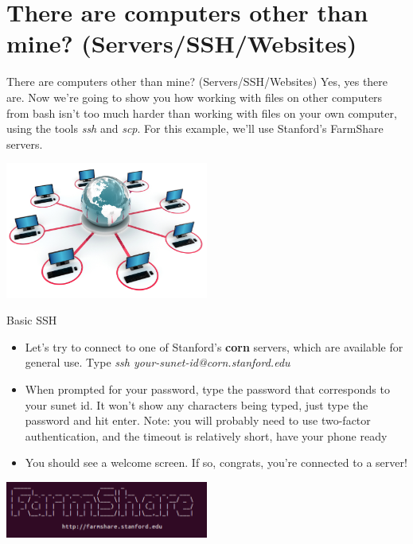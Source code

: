 \documentclass{beamer}
\begin{document}
\section{There are computers other than mine? (Servers/SSH/Websites)}
\begin{frame}{There are computers other than mine? (Servers/SSH/Websites)}
Yes, yes there are. Now we're going to show you how working with files on other computers from bash isn't too much harder than working with files on your own computer, using the tools \emph{ssh} and \emph{scp}. For this example, we'll use Stanford's FarmShare servers.\\[1em]
\begin{center}
\includegraphics[width = 0.5\textwidth]{images/network.jpg}
\end{center}
\end{frame}

\begin{frame}{Basic SSH}
\begin{itemize}
    \item<1-> Let's try to connect to one of Stanford's \textbf{corn} servers, which are available for general use. Type \emph{ssh your-sunet-id@corn.stanford.edu}
    \item<1-> When prompted for your password, type the password that corresponds to your sunet id. It won't show any characters being typed, just type the password and hit enter. Note: you will probably need to use two-factor authentication, and the timeout is relatively short, have your phone ready
    \item<2-> You should see a welcome screen. If so, congrats, you're connected to a server!
\end{itemize}
\begin{center}\vspace{0em}\includegraphics[width = 0.5\textwidth]{images/farmshare.png}\end{center}
\end{frame}
\end{document}
